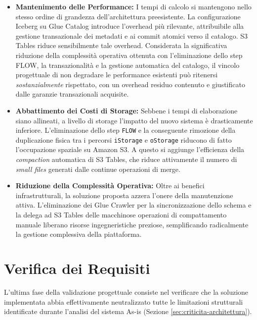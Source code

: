 \documentclass[12pt,a4paper,openright,twoside]{book}
\begin{document}
\begin{itemize}
    \item \textbf{Mantenimento delle Performance:} I tempi di calcolo si mantengono nello stesso ordine di grandezza dell'architettura preesistente. La configurazione Iceberg su Glue Catalog introduce l'overhead più rilevante, attribuibile alla gestione transazionale dei metadati e ai commit atomici verso il catalogo. S3 Tables riduce sensibilmente tale overhead. Considerata la significativa riduzione della complessità operativa ottenuta con l'eliminazione dello step FLOW, la transazionalità e la gestione automatica del catalogo, il vincolo progettuale di non degradare le performance esistenti può ritenersi \textit{sostanzialmente} rispettato, con un overhead residuo contenuto e giustificato dalle garanzie transazionali acquisite.
    
    \item \textbf{Abbattimento dei Costi di Storage:} Sebbene i tempi di elaborazione siano allineati, a livello di storage l'impatto del nuovo sistema è drasticamente inferiore. L'eliminazione dello step \texttt{FLOW} e la conseguente rimozione della duplicazione fisica tra i percorsi \texttt{iStorage} e \texttt{oStorage} riducono di fatto l'occupazione spaziale su Amazon S3. A questo si aggiunge l'efficienza della \textit{compaction} automatica di S3 Tables, che riduce attivamente il numero di \textit{small files} generati dalle continue operazioni di merge.
    
    \item \textbf{Riduzione della Complessità Operativa:} Oltre ai benefici infrastrutturali, la soluzione proposta azzera l'onere della manutenzione attiva. L'eliminazione dei Glue Crawler per la sincronizzazione dello schema e la delega ad S3 Tables delle macchinose operazioni di compattamento manuale liberano risorse ingegneristiche preziose, semplificando radicalmente la gestione complessiva della piattaforma.
\end{itemize}

\section{Verifica dei Requisiti}
\label{sec:verifica-requisiti}
L'ultima fase della validazione progettuale consiste nel verificare che la soluzione implementata abbia effettivamente neutralizzato tutte le limitazioni strutturali identificate durante l'analisi del sistema As-is (Sezione \ref{sec:criticita-architettura}).
\end{document}
